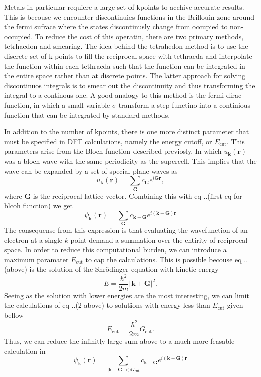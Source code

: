 Metals in particular requiere a large set of kpoints to acchive accurate results. This is becouse we encounter discontinuies functions in the Brillouin zone around the fermi sufrace where the states discontinusly change from occupied to non-occupied. To reduce the cost of this operatin, there are two primary methods, tetrhaedon and smearing. The idea behind the tetrahedon method is to use the discrete set of k-points to fill the reciprocal space with tethraeda and interpolate the function within each tethraeda such that the function can be integrated in the entire space rather than at discrete points. The latter approach for solving discontinuos integrals is to smear out the discontinuity and thus transforming the integral to a continous one. A good analogy to this method is the fermi-dirac function, in which a small variable $\sigma$ transform a step-functino into a continious function that can be integrated by standard methods.

In addition to the number of kpoints, there is one more distinct parameter that must be specified in DFT calculations, namely the energy cutoff, or $E_{\text{cut}}$. This parameters arise from the Bloch function described previosly. In which $u_{\boldsymbol{k}}(\boldsymbol{r})$ was a bloch wave with the same periodicity as the supercell. This implies that the wave can be expanded by a set of special plane waves as
\begin{equation}
    u_{\boldsymbol{k}}(\boldsymbol{r}) = \sum_{\boldsymbol{G}} c_{\boldsymbol{G}}e^{i\boldsymbol{G}\boldsymbol{r}},
\end{equation}
where $\boldsymbol{G}$ is the reciprocal lattice vector. Combining this with eq ..(first eq for blcoh function) we get 
\begin{equation}
    \psi_{\boldsymbol{k}}(\boldsymbol{r}) = \sum_{\boldsymbol{G}} c_{\boldsymbol{k} + \boldsymbol{G}}e^{i(\boldsymbol{k} + \boldsymbol{G})\boldsymbol{r}}
\end{equation}
The consequense from this expression is that evaluating the wavefunction of an electron at a single $k$ point demand a summation over the entirity of reciprocal space. In order to reduce this computational burden, we can introduce a maximum paramater $E_{\text{cut}}$ to cap the calculations. This is possible becouse eq ..(above) is the solution of the Shr\"{o}dinger equation with kinetic energy 
\begin{equation}
    E = \frac{\hbar^2}{2m}|\boldsymbol{k} + \boldsymbol{G}|^2.
\end{equation}
Seeing as the solution with lower energies are the most interesting, we can limit the calculations of eq ..(2 above) to solutions with energy less than $E_{\text{cut}}$ given bellow
\begin{equation}
    E_{\text{cut}} = \frac{\hbar^2}{2m}G_{\text{cut}}.
\end{equation}
Thus, we can reduce the infinitly large sum above to a much more feasable calculation in 
\begin{equation}
    \psi_{\boldsymbol{k}}(\boldsymbol{r}) = \sum_{|\boldsymbol{k} + \boldsymbol{G}| < G_{\text{cut}}} c_{\boldsymbol{k} + \boldsymbol{G}}e^{i(\boldsymbol{k} + \boldsymbol{G})\boldsymbol{r}}
\end{equation}

